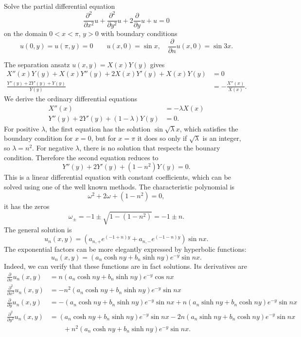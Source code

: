 Solve the partial differential equation
\[
\frac{\partial^2}{\partial x^2}u+\frac{\partial^2}{\partial y^2}u
+2\frac{\partial }{\partial y}u+u=0
\]
on the domain $0 < x < \pi$, $y > 0$ with boundary conditions
\[
u(0,y)=u(\pi,y)=0
\quad
\quad
u(x,0)=\sin x,\quad \frac{\partial }{\partial n}u(x,0)=\sin 3x.
\]

\begin{loesung}
The separation ansatz $u(x,y)=X(x)Y(y)$ gives
\begin{align*}
X''(x)Y(y)+X(x)Y''(y)+2X(x)Y'(y)+X(x)Y(y)&=0
\\
\frac{Y''(y)+2Y'(y)+Y(y)}{Y(y)}
&=
-\frac{X''(x)}{X(x)}.
\end{align*}
We derive the ordinary differential equations
\begin{align*}
X''(x)&=-\lambda X(x)\\
Y''(y)+2Y'(y)+(1-\lambda)Y(y)&=0.
\end{align*}
For positive $\lambda$, the first equation has the solution
$\sin\sqrt{\lambda}x$, which satisfies the boundary condition for $x=0$,
but for $x=\pi$ it does so only if $\sqrt{\lambda}$ is an integer, so
$\lambda=n^2$.
For negative $\lambda$, there is no solution that respects the bounary
condition.
Therefore the second equation reduces to
\[
Y''(y)+2Y'(y)+(1-n^2)Y(y)=0.
\]
This is a linear differential equation with constant coefficients,
which can be solved using one of the well known methods.
The characteristic polynomial is
\[
\omega^2+2\omega+(1-n^2)=0,
\]
it has the zeros
\[
\omega_{\pm}=-1\pm{\sqrt{1-(1-n^2)}}=-1\pm n.
\]
The general solution is
\[
u_n(x,y)=(a_{n,+}e^{(-1+n)y}+a_{n,-}e^{(-1-n)y})\sin nx.
\]
The exponential factors can be more elegantly expressed by hyperbolic
functions:
\[
u_n(x,y)=(a_n\cosh ny+b_n\sinh ny)e^{-y}\sin nx.
\]
Indeed, we can verify that these functions are in fact solutions.
Its derivatives are
\begin{align*}
\frac{\partial}{\partial x}u_n(x,y)
&=
n (a_n\cosh ny+b_n\sinh ny)e^{-y}\cos nx
\\
\frac{\partial^2}{\partial x^2}u_n(x,y)
&=
-n^2 (a_n\cosh ny+b_n\sinh ny)e^{-y}\sin nx
\\
\frac{\partial}{\partial y}u_n(x,y)
&=
-(a_n\cosh ny+b_n\sinh ny)e^{-y}\sin nx
+
n(a_n\sinh ny+b_n\cosh ny)e^{-y}\sin nx
\\
\frac{\partial^2}{\partial y^2}u_n(x,y)
&=
(a_n\cosh ny+b_n\sinh ny)e^{-y}\sin nx
-2n(a_n\sinh ny+b_n\cosh ny)e^{-y}\sin nx
\\
&\qquad
+n^2(a_n\cosh ny+b_n\sinh ny)e^{-y}\sin nx.
\end{align*}

\end{loesung}
